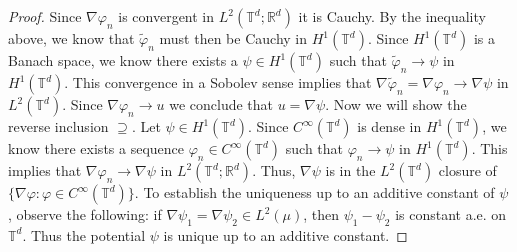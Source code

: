\documentclass[11pt]{article}
\begin{document}
\begin{proof}
    Since $\nabla \varphi_n$ is convergent in $L^2(\mathbb{T}^d; \mathbb{R}^d)$ it is Cauchy. By the inequality above, we know that $\tilde \varphi_n$ must then be Cauchy in $H^1(\mathbb{T}^d)$. Since $H^1(\mathbb{T}^d)$ is a Banach space, we know there exists a $\psi \in H^1(\mathbb{T}^d)$ such that $\tilde \varphi_n \rightarrow \psi$ in $H^1(\mathbb{T}^d).$ This convergence in a Sobolev sense implies that $\nabla \tilde \varphi_n = \nabla \varphi_n \rightarrow \nabla \psi$ in $L^2(\mathbb{T}^d).$ Since $\nabla \varphi_n \rightarrow u$ we conclude that $u = \nabla \psi$. Now we will show the reverse inclusion $\supseteq$. Let $\psi \in H^1(\mathbb{T}^d)$. Since $C^\infty(\mathbb{T}^d)$ is dense in $H^1(\mathbb{T}^d)$, we know there exists a sequence $\varphi_n \in C^\infty(\mathbb{T}^d)$ such that $\varphi_n \rightarrow \psi$ in $H^1(\mathbb{T}^d).$ This implies that $\nabla \varphi_n \rightarrow \nabla \psi$ in $L^2(\mathbb{T}^d; \mathbb{R}^d)$. Thus, $\nabla \psi$ is in the $L^2(\mathbb{T}^d)$ closure of $\{\nabla \varphi: \varphi \in C^\infty(\mathbb{T}^d)\}$. To establish the uniqueness up to an additive constant of $\psi$, observe the following: if $\nabla \psi_1 = \nabla \psi_2 \in L^2(\mu)$, then $\psi_1 - \psi_2$ is constant a.e. on $\mathbb{T}^d$. Thus the potential $\psi$ is unique up to an additive constant. 
\end{proof}
\end{document}
